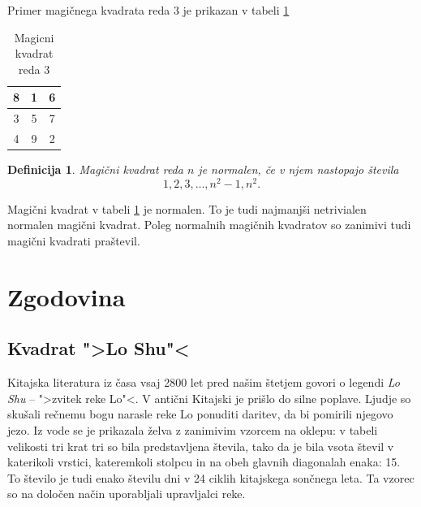 \documentclass[a4paper,12pt]{article}
\newtheorem{definicija}[izrek]{Definicija}
\begin{document}
Primer magičnega kvadrata reda 3 je prikazan v tabeli \ref{table:mag3} %


\begin{table}[!ht]
   \centering
   \caption{Magicni kvadrat reda 3}
   \label{table:mag3}
   \large
   \begin{tabular}{|*{3}{c|}} \hline 
      8 & 1 & 6 \\\hline
      3 & 5 & 7 \\\hline
      4 & 9 & 2 \\\hline
   \end{tabular}
   
\end{table}


\begin{definicija}
   Magični kvadrat reda $n$ je \emph{normalen}, če v njem nastopajo števila
   \begin{equation}
      \label{eq:numbers}
      1, 2, 3, \ldots, n^2-1, n^2.
   \end{equation}
\end{definicija}

Magični kvadrat v tabeli \ref{table:mag3} je normalen.
To je tudi najmanjši netrivialen normalen magični kvadrat.
Poleg normalnih magičnih kvadratov so zanimivi tudi magični kvadrati praštevil.


\section{Zgodovina}

\subsection{Kvadrat ">Lo Shu"<}

Kitajska literatura iz časa vsaj 2800 let pred našim štetjem govori o legendi
\emph{Lo Shu} -- ">zvitek reke Lo"<. V antični Kitajski je prišlo do
silne poplave. Ljudje so skušali rečnemu bogu narasle reke Lo ponuditi daritev,
da bi pomirili njegovo jezo. Iz vode se je prikazala želva z zanimivim vzorcem
na oklepu: v tabeli velikosti tri krat tri so bila predstavljena števila, tako
da je bila vsota števil v katerikoli vrstici, kateremkoli stolpcu in na obeh
glavnih diagonalah enaka: 15. To število je tudi enako številu dni v 24 ciklih
kitajskega sončnega leta. Ta vzorec so na določen način uporabljali upravljalci
reke.
\end{document}
